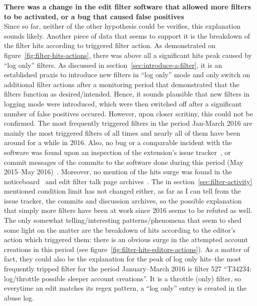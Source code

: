 \textbf{There was a change in the edit filter software that allowed more filters to be activated, or a bug that caused false positives}\\
Since so far, neither of the other hypothesis could be verifies, this explanation sounds likely.
Another piece of data that seems to support it is the breakdown of the filter hits according to triggered filter action.
As demonstrated on figure~\ref{fig:filter-hits-actions}, there was above all a significant hits peak caused by ``log only'' filters.
As discussed in section~\ref{sec:introduce-a-filter}, it is an established praxis to introduce new filters in ``log only'' mode and only switch on additional filter actions after a monitoring period that demonstrated that the filters function as desired/intended.
Hence, it sounds plausible that new filters in logging mode were introduced, which were then switched off after a significant number of false positives occured.
However, upon closer scritiny, this could not be confirmed.
The most frequently triggered filters in the period Jan-March 2016 are mainly the most triggered filters of all times and nearly all of them have been around for a while in 2016.
Also, no bug or a comparable incident with the software was found upon an inspection of the extension's issue tracker~\cite{phab-abusefilter-2015}, or commit messages of the commits to the software done during this period (May 2015–May 2016)~\cite{gerrit-abusefilter-source}.
Moreover, no mention of the hits surge was found in the noticeboard~\cite{Wikipedia:EditFilterNoticeboard} and edit filter talk page archives~\cite{Wikipedia:EditFilterTalkArchive2016}.
The in section~\ref{sec:filter-activity} mentioned condition limit has not changed either, as far as I can tell from the issue tracker, the commits and discussion archives, so the possible explanation that simply more filters have been at work since 2016 seems to be refuted as well.
The only somewhat telling/interesting patterns/phenomena that seem to shed some light on the matter are the breakdown of hits according to the editor's action which triggered them: there is an obvious surge in the attempted account creations in this period (see figure~\ref{fig:filter-hits-editors-actions}).
As a matter of fact, they could also be the explanation for the peak of log only hits–the most frequently tripped filter for the period January–March 2016 is filter 527 ``T34234: log/throttle possible sleeper account creations''.
It is a throttle (only) filter, so everytime an edit matches its regex pattern, a ``log only'' entry is created in the abuse log.


